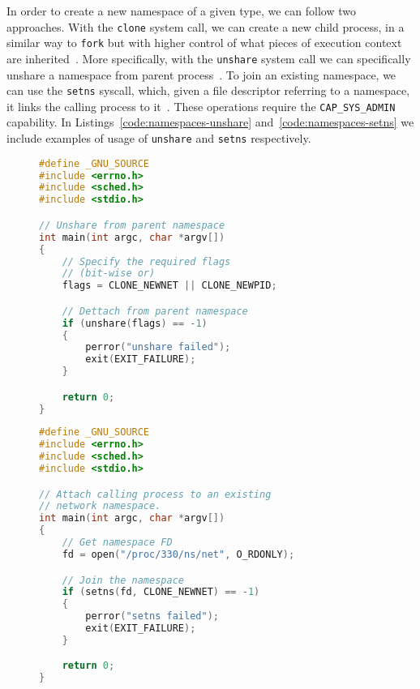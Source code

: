 In order to create a new namespace of a given type, we can follow two approaches.
With the \texttt{clone} system call, we can create a new child process, in a similar way to \texttt{fork} but with higher control of what pieces of execution context are inherited~\cite{clone-manual}.
More specifically, with the \texttt{unshare} system call we can specifically unshare a namespace from parent process~\cite{unshare-manual}.
To join an existing namespace, we can use the \texttt{setns} syscall, which, given a file descriptor referring to a namespace, it links the calling process to it~\cite{setns-manual}.
These operations require the \texttt{CAP\_SYS\_ADMIN} capability.
In Listings~\ref{code:namespaces-unshare} and~\ref{code:namespaces-setns} we include examples of usage of \texttt{unshare} and \texttt{setns} respectively.
\begin{figure}[h!]
    \begin{minipage}{.45\textwidth}
        \begin{lstlisting}[language=C,caption={Snippet to unshare the calling thread from a namespace using \texttt{unshare}.\label{code:namespaces-unshare}}]
#define _GNU_SOURCE
#include <errno.h>
#include <sched.h>
#include <stdio.h>

// Unshare from parent namespace
int main(int argc, char *argv[])
{
    // Specify the required flags
    // (bit-wise or)
    flags = CLONE_NEWNET || CLONE_NEWPID;

    // Dettach from parent namespace
    if (unshare(flags) == -1)
    {
        perror("unshare failed");
        exit(EXIT_FAILURE);        
    }

    return 0;
}
\end{lstlisting}
    \end{minipage} \hfill
    \begin{minipage}{.45\textwidth}
        \begin{lstlisting}[language=C,caption={Snippet to attach to an existing network namespace.\label{code:namespaces-setns}}]
#define _GNU_SOURCE
#include <errno.h>
#include <sched.h>
#include <stdio.h>

// Attach calling process to an existing
// network namespace.
int main(int argc, char *argv[])
{
    // Get namespace FD
    fd = open("/proc/330/ns/net", O_RDONLY);

    // Join the namespace
    if (setns(fd, CLONE_NEWNET) == -1)
    {
        perror("setns failed");
        exit(EXIT_FAILURE);        
    }

    return 0;
}
\end{lstlisting}
    \end{minipage}
\end{figure}

